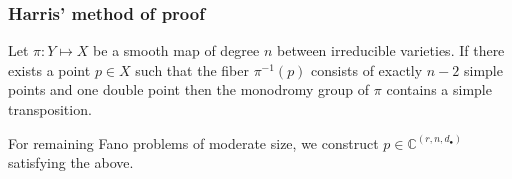 \documentclass{beamer}
\theoremstyle{definition}
\begin{document}









\begin{frame}
\frametitle{Harris' method of proof}
\begin{lemma}[Harris]

\vspace{.05cm}

Let $\pi:Y\mapsto X$ be a smooth map of degree $n$ between irreducible varieties. If there exists a point $p\in X$ such that the fiber $\pi^{-1}(p)$ consists of exactly $n-2$ simple points and one double point then the monodromy group of $\pi$ contains a simple transposition.
\end{lemma}

\vspace{.2cm}

For remaining Fano problems of moderate size, we construct $p\in \mathbb{C}^{(r,n,d_\bullet)}$ satisfying the above.

\end{frame}
\end{document}
